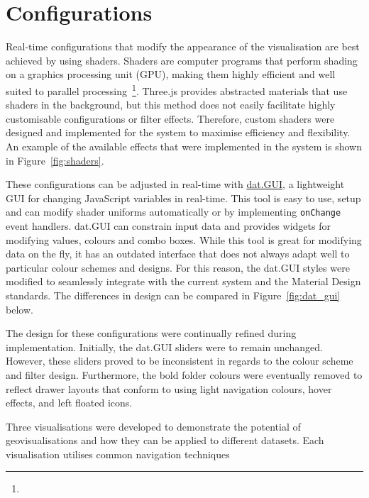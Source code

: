 \section{Configurations} {
\label{sec:configurations}

	Real-time configurations that modify the appearance of the visualisation are best achieved by using shaders. Shaders are computer programs that perform shading on a graphics processing unit (GPU), making them highly efficient and well suited to parallel processing~\footnote{}. Three.js provides abstracted materials that use shaders in the background, but this method does not easily facilitate highly customisable configurations or filter effects. Therefore, custom shaders were designed and implemented for the system to maximise efficiency and flexibility. An example of the available effects that were implemented in the system is shown in Figure~\ref{fig:shaders}.

	

	These configurations can be adjusted in real-time with \href{http://workshop.chromeexperiments.com/}{dat.GUI}, a lightweight GUI for changing JavaScript variables in real-time. This tool is easy to use, setup and can modify shader uniforms automatically or by implementing \texttt{onChange} event handlers. dat.GUI can constrain input data and provides widgets for modifying values, colours and combo boxes. While this tool is great for modifying data on the fly, it has an outdated interface that does not always adapt well to particular colour schemes and designs. For this reason, the dat.GUI styles were modified to seamlessly integrate with the current system and the Material Design standards. The differences in design can be compared in Figure~\ref{fig:dat_gui} below.

	

	The design for these configurations were continually refined during implementation. Initially, the dat.GUI sliders were to remain unchanged. However, these sliders proved to be inconsistent in regards to the colour scheme and filter design. Furthermore, the bold folder colours were eventually removed to reflect drawer layouts that conform to using light navigation colours, hover effects, and left floated icons.

}

Three visualisations were developed to demonstrate the potential of geovisualisations and how they can be applied to different datasets. Each visualisation utilises common navigation techniques
